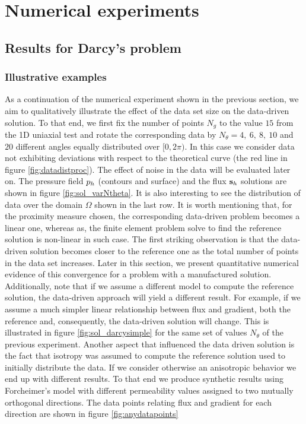 \section{Numerical experiments}

\subsection{Results for Darcy's problem}

\subsubsection{Illustrative examples}

As a continuation of the numerical experiment shown in the previous section, we aim to 
qualitatively illustrate the effect of the data set size on the data-driven solution. To that end, we first fix the number of points $N_g$ to the value $15$ from the 1D uniaxial test and rotate the corresponding
data by $N_{\theta} = 4,~6,~8,~10$ and $20$ different angles equally distributed
over $[0,2\pi)$. In this case we consider data not exhibiting deviations with
respect to the theoretical curve (the red line in figure \ref{fig:datadistproc}). 
The effect of noise in the data will be evaluated later on.
The pressure field $p_h$ (contours and surface) and the flux $\mathbf{s}_h$ 
solutions are shown in figure \ref{fig:sol_varNtheta}. It is also interesting
to see the distribution of data over the domain $\Omega$ shown in the last
row. It is worth mentioning that, for the proximity measure chosen, the corresponding
data-driven problem becomes a linear one, whereas as, the finite element problem
solve to find the reference solution is non-linear in such case.  
The first striking observation is that the data-driven solution becomes closer to the reference one as the total number of points in the data set increases. Later in this section, we present quantitative numerical evidence of this convergence for a problem with a manufactured solution. Additionally, note that if we assume a different model to compute the reference solution, the data-driven approach will yield a different result. For example, if we assume a much simpler linear relationship between flux and gradient, both the reference and, consequently, the data-driven solution will change. This is illustrated in figure \ref{fig:sol_darcysimple}
for the same set of values $N_{\theta}$ of the previous experiment.
Another aspect that influenced the data driven solution is the fact that 
isotropy was assumed to compute the reference solution used
to initially distribute the data. If we consider otherwise an anisotropic behavior
we end up with different results. To that end we produce synthetic results
using Forcheimer's model with different permeability values assigned to two mutually 
orthogonal directions. The data points relating flux and gradient for each 
direction are shown in figure \ref{fig:anydatapoints}

